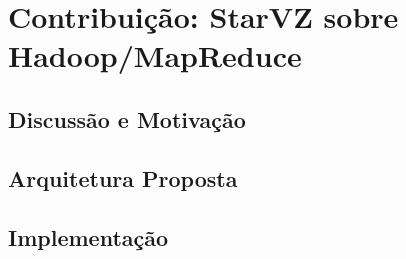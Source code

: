 \chapter{Contribuição: StarVZ sobre Hadoop/MapReduce} \label{ch:contribution}

\section{Discussão e Motivação}

\section{Arquitetura Proposta}

\section{Implementação}